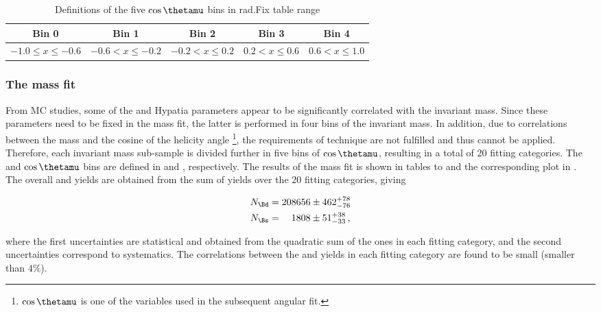\begin{table}[!h]
\begin{tabular}{c|c|c|c|c}
\hline
 Bin 0 & Bin 1 & Bin 2 & Bin 3 & Bin 4\\	
\hline
\multirow{2}{*}{$ -1.0 \leq x \leq -0.6 $} & \multirow{2}{*}{$ -0.6 < x \leq -0.2 $} & \multirow{2}{*}{$ -0.2 < x \leq 0.2 $}& \multirow{2}{*}{$ 0.2 < x \leq 0.6 $} & \multirow{2}{*}{$ 0.6 < x \leq 1.0 $} \\
					      	 					  &   &	& & \\	
\hline
 \end{tabular}
\caption{Definitions of the five $\cos\thetamu$ bins in rad.{\color{red}Fix table range}}
\label{cosThateMubindef} 
\end{table}

\subsubsection{The mass fit}
From MC studies, some of the \Bs and \Bd Hypatia parameters appear to be significantly correlated with the \mkpi invariant mass. 
Since these parameters need to be fixed in the mass fit, the latter is performed in four bins of the
\mkpi invariant mass. In addition, due to correlations between the mass and the cosine of the helicity angle \thetamu\footnote{$\cos\thetamu$ is one of 
the variables used in the subsequent angular fit.},
the requirements of \sPlot technique are not fulfilled and thus cannot be applied. Therefore, each \mkpi invariant mass sub-sample
is divided further in five bins of $\cos\thetamu$, resulting in a total of 20 fitting categories. The \mkpi and $\cos\thetamu$ bins are defined 
in  and , respectively. The results of the mass fit is shown in tables 
to  and the corresponding plot in . The overall \Bs and \Bd yields are obtained from the sum 
of yields over the 20 fitting categories, giving

\begin{align}
N_{\Bd} &= 208656  \pm  462 ^{+ 78	}_{- 76}\\
N_{\Bs} &= \phantom{00}1808  \pm   51 ^{+ 38	}_{- 33} \, ,
\end{align}

\noindent where the first uncertainties are statistical and obtained from the quadratic sum of the ones in each fitting category, 
and the second uncertainties correspond to systematics. The correlations between the \Bd and \Bs yields in each fitting category
are found to be small (smaller than $4\%$).

